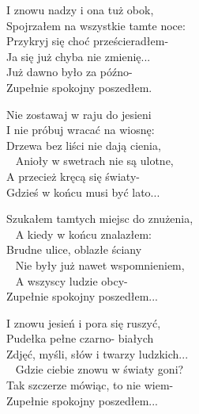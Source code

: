 \begin{text}
I znowu nadzy i ona tuż obok, \\
Spojrzałem na wszystkie tamte noce:\\
Przykryj się choć prześcieradłem-\\
Ja się już chyba nie zmienię...\\
Już dawno było za późno-\\
Zupełnie spokojny poszedłem. 

\vin Nie zostawaj w raju do jesieni\\
\vin I nie próbuj wracać na wiosnę:\\
\vin Drzewa bez liści nie dają cienia,\\ 
\vin Anioły w swetrach nie są ulotne,\\
\vin A przecież kręcą się światy-\\
\vin Gdzieś w końcu musi być lato... 

Szukałem tamtych miejsc do znużenia,\\ 
A kiedy w końcu znalazłem:\\
Brudne ulice, oblazłe ściany\\ 
Nie były już nawet wspomnieniem,\\ 
A wszyscy ludzie obcy-\\
Zupełnie spokojny poszedłem... 

I znowu jesień i pora się ruszyć,\\
Pudełka pełne czarno- białych\\
Zdjęć, myśli, słów i twarzy ludzkich...\\ 
Gdzie ciebie znowu w światy goni?\\
Tak szczerze mówiąc, to nie wiem-\\
Zupełnie spokojny poszedłem... 
\end{text}